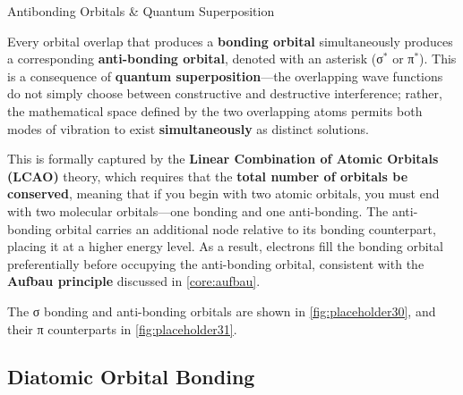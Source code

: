 \documentclass[10pt]{article}
\begin{document}
    \begin{core}{Antibonding Orbitals \& Quantum Superposition}

      Every orbital overlap that produces a \textbf{bonding orbital} simultaneously produces a corresponding \textbf{anti-bonding orbital}, denoted with an asterisk (σ$^*$ or π$^*$). This is a consequence of \textbf{quantum superposition}---the overlapping wave functions do not simply choose between constructive and destructive interference; rather, the mathematical space defined by the two overlapping atoms permits both modes of vibration to exist \textbf{simultaneously} as distinct solutions.


      This is formally captured by the \textbf{Linear Combination of Atomic Orbitals (LCAO)} theory, which requires that the \textbf{total number of orbitals be conserved}, meaning that if you begin with two atomic orbitals, you must end with two molecular orbitals---one bonding and one anti-bonding. The anti-bonding orbital carries an additional node relative to its bonding counterpart, placing it at a higher energy level. As a result, electrons fill the bonding orbital preferentially before occupying the anti-bonding orbital, consistent with the \textbf{Aufbau principle} discussed in \autoref{core:aufbau}.

      The σ bonding and anti-bonding orbitals are shown in \autoref{fig:placeholder30}, and their π counterparts in \autoref{fig:placeholder31}.


    \end{core}

  \subsection{Diatomic Orbital Bonding}
    \label{sec:diatomic}
\end{document}
